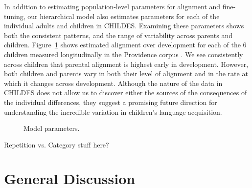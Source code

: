 \documentclass[10pt,letterpaper]{article}
\begin{document}
In addition to estimating population-level parameters for alignment and fine-tuning, our hierarchical model also estimates parameters for each of the individual adults and children in CHILDES. Examining these parameters shows both the consistent patterns, and the range of variability across parents and children. Figure~\ref{fig:providence_hpds} shows estimated alignment over development for each of the 6 children measured longitudinally in the Providence corpus \cite{demuth2006}. We see consistently across children that parental alignment is highest early in development. However, both children and parents vary in both their level of alignment and in the rate at which it changes across development. Although the nature of the data in CHILDES does not allow us to discover either the sources of the consequences of the individual differences, they suggest a promising future direction for understanding the incredible variation in children's language acquisition.

\begin{figure}[tb]
  \caption{\label{fig:providence_hpds} Model parameters.}
\end{figure}

Repetition vs. Category stuff here?

\section{General Discussion}

%
\end{document}
